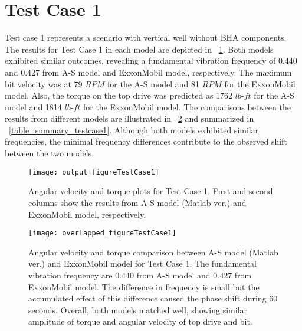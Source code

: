 \section{Test Case 1}
Test case 1 represents a scenario with vertical well without BHA components. The results for Test Case 1 in each model are depicted in \figurename~\ref{figure_testcase1}. Both models exhibited similar outcomes, revealing a fundamental vibration frequency of 0.440 and 0.427 from A-S model and ExxonMobil model, respectively. The maximum bit velocity was at 79 $RPM$ for the A-S model and 81 $RPM$ for the ExxonMobil model. Also, the torque on the top drive was predicted as 1762 $lb\mbox{-}ft$ for the A-S model and 1814 $lb\mbox{-}ft$ for the ExxonMobil model. The comparisons between the results from different models are illustrated in \figurename~\ref{figure_testcase1_overlapped} and summarized in \tablename~\ref{table_summary_testcase1}. Although both models exhibited similar frequencies, the minimal frequency differences contribute to the observed shift between the two models.
\begin{figure}[!hbt]
  \centering
  \texttt{[image: output\_figureTestCase1]}
  \caption[Angular velocity and torque plots for Test Case 1]{Angular velocity and torque plots for Test Case 1. First and second columns show the results from A-S model (Matlab ver.) and ExxonMobil model, respectively.}\label{figure_testcase1}
\end{figure}
\begin{figure}
  \centering
  \texttt{[image: overlapped\_figureTestCase1]}
  \caption[Angular velocity and torque comparison plots for Test Case 1]{Angular velocity and torque comparison between A-S model (Matlab ver.) and ExxonMobil model for Test Case 1. The fundamental vibration frequency are 0.440 from A-S model and 0.427 from ExxonMobil model. The difference in frequency is small but the accumulated effect of this difference caused the phase shift during 60 seconds. Overall, both models matched well, showing similar amplitude of torque and angular velocity of top drive and bit.}\label{figure_testcase1_overlapped}
\end{figure}

